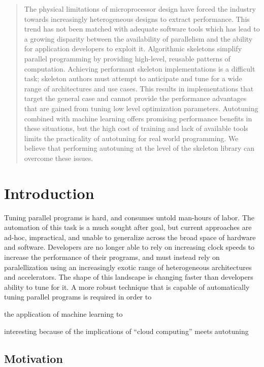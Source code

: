 \begin{abstract}
  The physical limitations of microprocessor design have forced the
  industry towards increasingly heterogeneous designs to extract
  performance. This trend has not been matched with adequate software
  tools which has lead to a growing disparity between the availability
  of parallelism and the ability for application developers to exploit
  it. Algorithmic skeletons simplify parallel programming by providing
  high-level, reusable patterns of computation. Achieving performant
  skeleton implementations is a difficult task; skeleton authors must
  attempt to anticipate and tune for a wide range of architectures and
  use cases. This results in implementations that target the general
  case and cannot provide the performance advantages that are gained
  from tuning low level optimization parameters. Autotuning combined
  with machine learning offers promising performance benefits in these
  situations, but the high cost of training and lack of available
  tools limits the practicality of autotuning for real world
  programming. We believe that performing autotuning at the level of
  the skeleton library can overcome these issues.
\end{abstract}

\tableofcontents


\section{Introduction}

Tuning parallel programs is hard, and consumes untold man-hours of
labor. The automation of this task is a much sought after goal, but
current approaches are ad-hoc, impractical, and unable to generalize
across the broad space of hardware and software. Developers are no
longer able to rely on increasing clock speeds to increase the
performance of their programs, and must instead rely on
paralellization using an increasingly exotic range of heterogeneous
architectures and accelerators. The shape of this landscape is
changing faster than developers ability to tune for it. A more robust
technique that is capable of automatically tuning parallel programs is
required in order to

the application of machine learning to

interesting because of the implications of ``cloud computing'' meets
autotuning


\subsection{Motivation}

